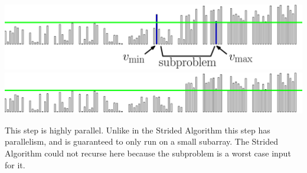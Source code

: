 \documentclass[xcolor=x11names, svgnames, rgb]{beamer}
\begin{document}
\begin{frame}[t]{}
\begin{overprint}
	\includegraphics[width=\linewidth]{imgs/smoothedAlgSim/smoothedAlgSim_45.eps}
	\onslide<7>\includegraphics[width=\linewidth]{imgs/smoothedAlgSim/smoothedAlgSim_5.eps}
	\end{overprint}
	\vspace{0.25cm}
	\begin{overprint}
	This step is highly parallel.
	\onslide<7>Unlike in the Strided Algorithm this step has parallelism, and is guaranteed to only run on a small subarray. The Strided Algorithm could not recurse here because the subproblem is a worst case input for it.
	\end{overprint}
\end{frame}

\end{document}
